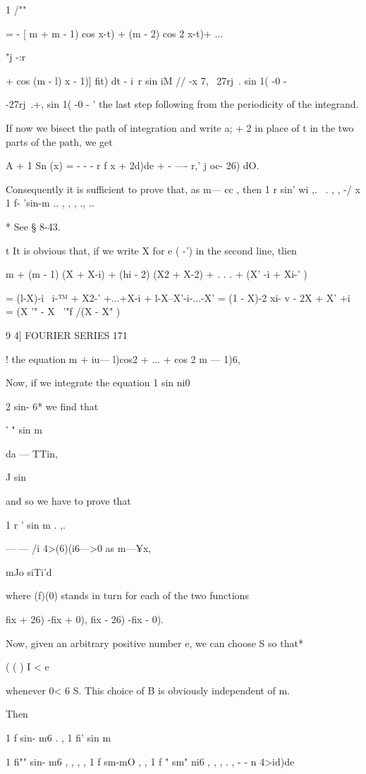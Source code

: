1 /""

= - [ m + m - 1) cos x-t) + (m - 2) cos 2 x-t)+ ...

 "j -:r

+ cos (m - l) x - 1)] fit) dt - i\ r sin iM // -x 7, ~27rj\ . sin 1(
-0 -

-27rj\ .+, sin 1( -0 - ' the last step following from the periodicity
of the integrand.

If now we bisect the path of integration and write a; + 2 in place of
t in the two parts of the path, we get

A + 1 Sn (x) = - - - r f x + 2d)de + - —- r,' j oc- 26) dO.

Consequently it is sufficient to prove that, as m— cc , then 1 r sin'
wi ,. \ . , , -/ x 1 f- 'sin-m .. , , , ., ..

* See § 8-43.

t It is obvious that, if we write X for e ( -') in the second line,
tlien

m + (m - 1) (X + X-i) + (hi - 2) (X2 + X-2) + . . . + (X' -i + Xi-' )

= (l-X)-i \ i-™ + X2-' +...+X-i + l-X--X'-i-...-X' = (1 - X)-2 xi- v -
2X + X' +i = (X '" - X~ '"f /(X - X" )

9 4] FOURIER SERIES 171

! the equation m + iu— l)cos2 + ... + cos 2 m — 1)6,

Now, if we integrate the equation 1 sin ni0

2 sin- 6* we find that

' " sin m

da — TTin,

J sin

and so we have to prove that

1 r ' sin m . ,.

— — /i 4>(6)(i6—>0 as m—¥x,

mJo siTi'd

where (f)(0) stands in turn for each of the two functions

fix + 26) -fix + 0), fix - 26) -fix - 0).

Now, given an arbitrary positive number e, we can choose S so that*

( ( ) I < e

whenever 0< 6 S. This choice of B is obviously independent of m.

Then

1 f sin- m6 . , 1 fi' sin m

1 fi"" sin- m6 , , , , 1 f sm-mO , , 1 f " sm" ni6 , , , . , - - n
4>id)de %

